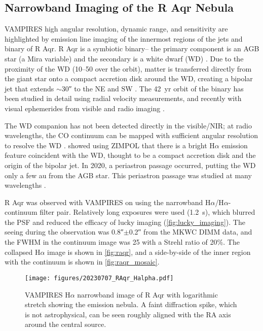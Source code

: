 \subsection{Narrowband Imaging of the R Aqr Nebula\label{sec:raqr}}

VAMPIRES high angular resolution, dynamic range, and sensitivity are highlighted by emission line imaging of the innermost regions of the jets and binary of R Aqr. R Aqr is a symbiotic binary-- the primary component is an AGB star (a Mira variable) and the secondary is a white dwarf (WD) \citep{merrill_partial_1935,merrill_spectra_1940}. Due to the proximity of the WD (\SIrange{10}{50}{\mas} over the orbit), matter is transferred directly from the giant star onto a compact accretion disk around the WD, creating a bipolar jet that extends $\sim$\ang{;;30} to the NE and SW \citep[and references therein]{schmid_spherezimpol_2017}. The \SI{42}{yr} orbit of the binary has been studied in detail using radial velocity measurements, and recently with visual ephemerides from visible and radio imaging \citep{gromadzki_spectroscopic_2009,bujarrabal_high-resolution_2018,alcolea_determining_2023}. 

The WD companion has not been detected directly in the visible/NIR; at radio wavelengths, the CO continuum can be mapped with sufficient angular resolution to resolve the WD \citep{bujarrabal_high-resolution_2018,alcolea_determining_2023}. \citet{schmid_spherezimpol_2017} showed using ZIMPOL that there is a bright H$\alpha$ emission feature coincident with the WD, thought to be a compact accretion disk and the origin of the bipolar jet. In 2020, a periastron passage occurred, putting the WD only a few \si{au} from the AGB star. This periastron passage was studied at many wavelengths \citep{hinkle_2020_2022,sacchi_front-row_2024}.

R Aqr was observed with VAMPIRES on  using the narrowband H$\alpha$/H$\alpha$-continuum filter pair. Relatively long exposures were used (\SI{1.2}{s}), which blurred the PSF and reduced the efficacy of lucky imaging (\autoref{fig:lucky_imaging}). The seeing during the observation was \ang{;;0.8}$\pm$\ang{;;0.2} from the MKWC DIMM data, and the FWHM in the continuum image was \SI{25}{\mas} with a Strehl ratio of 20\%. The collapsed H$\alpha$ image is shown in \autoref{fig:raqr}, and a side-by-side of the inner region with the continuum is shown in \autoref{fig:raqr_mosaic}.


\begin{figure}
    \centering
    \texttt{[image: figures/20230707\_RAqr\_Halpha.pdf]}
    \caption{VAMPIRES H$\alpha$ narrowband image of R Aqr with logarithmic stretch showing the emission nebula. A faint diffraction spike, which is not astrophysical, can be seen roughly aligned with the RA axis around the central source.\label{fig:raqr}}
\end{figure}

